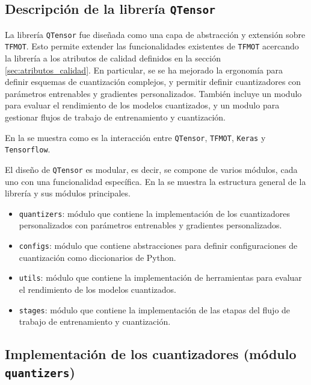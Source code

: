 \subsection{Descripción de la librería \texttt{QTensor}}

La librería \texttt{QTensor} fue diseñada como una capa de abstracción y extensión sobre \texttt{TFMOT}. Esto permite extender las funcionalidades existentes de \texttt{TFMOT} acercando la librería a los atributos de calidad definidos en la sección \ref{sec:atributos_calidad}. En particular, se se ha mejorado la ergonomía para definir esquemas de cuantización complejos, y permitir definir cuantizadores con parámetros entrenables y gradientes personalizados. También incluye un modulo para evaluar el rendimiento de los modelos cuantizados, y un modulo para gestionar flujos de trabajo de entrenamiento y cuantización.

En la  se muestra como es la interacción entre \texttt{QTensor}, \texttt{TFMOT}, \texttt{Keras} y \texttt{Tensorflow}.


El diseño de \texttt{QTensor} es modular, es decir, se compone de varios módulos, cada uno con una funcionalidad específica. En la  se muestra la estructura general de la librería y sus módulos principales.


\begin{itemize}
    \item \texttt{quantizers}: módulo que contiene la implementación de los cuantizadores personalizados con parámetros entrenables y gradientes personalizados.
    \item \texttt{configs}: módulo que contiene abstracciones para definir configuraciones de cuantización como diccionarios de Python.
    \item \texttt{utils}: módulo que contiene la implementación de herramientas para evaluar el rendimiento de los modelos cuantizados.
    \item \texttt{stages}: módulo que contiene la implementación de las etapas del flujo de trabajo de entrenamiento y cuantización.
\end{itemize}

\subsection{Implementación de los cuantizadores (módulo \texttt{quantizers})}


